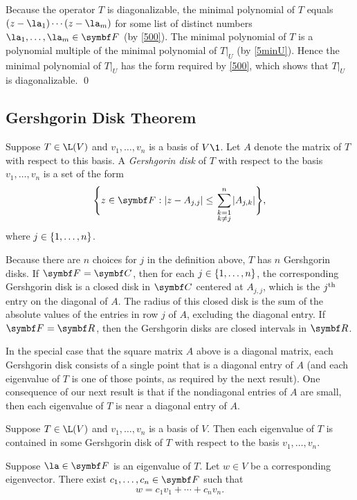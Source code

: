 \proof
Because the operator $T$ is diagonalizable, the minimal polynomial of $T$ equals $(z-\la_1) \cdots (z-\la_m)$ for some list of distinct numbers $\la_1, \ldots, \la_m \in \F{}$ (by \ref{500}). The minimal polynomial of $T$ is a polynomial multiple of the minimal polynomial of $T|_U$ (by \ref{5minU}). Hence the minimal polynomial of $T|_U$ has the form required by \ref{500}, which shows that $T|_U$ is diagonalizable.
\qed

\subsection{Gershgorin Disk Theorem}

{Suppose $T \in \L(V)$ and $v_1, \ldots, v_n$ is a basis of $V\1$. Let $A$ denote the matrix of $T$ with respect to this basis. A \emph{Gershgorin disk} of $T$ with respect to the basis $v_1, \ldots, v_n$ is a set of the
form
\[
\br[\Bigg]{ z \in \F{}: \abs{ z - A_{j,j} } \le \sum_{\scriptstyle k=1 \atop \scriptstyle k\ne j}^n \abs{A_{j,k}}},
\vspace{-.1in} %
\]
where $j \in \{1, \ldots, n\}$.}

Because there are $n$ choices for $j$ in the definition above, $T$ has $n$ Gershgorin disks. If $\F{} = \C{}$, then for each $j \in \{1, \ldots, n\}$, the corresponding Gershgorin disk is a closed disk in $\C{}$ centered at $A_{j,j}$, which is the $j^{\text{{th}}}$ entry on the diagonal of $A$. The radius of this closed disk is the sum of the absolute values of the entries in row $j$ of $A$, excluding the diagonal entry. If $\F{} = \R{}$, then the Gershgorin disks are closed intervals in $\R{}$.

In the special case that the square matrix $A$ above is a diagonal matrix, each Gershgorin disk consists of a single point that is a diagonal entry of $A$ (and each eigenvalue of $T$ is one of those points, as required by the next result). One consequence of our next result is that if the nondiagonal entries of $A$ are small, then each eigenvalue of $T$ is near a diagonal entry of $A$.

{Suppose $T \in \L(V)$ and $v_1, \ldots, v_n$ is a basis of $V$. Then each eigenvalue of $T$ is contained in some Gershgorin disk of $T$ with respect to the basis $v_1, \ldots, v_n$.}

\proof
Suppose $\la \in \F{}$ is an eigenvalue of $T$. Let $w \in V$ be a corresponding eigenvector. There exist $c_1, \ldots, c_n \in \F{}$ such that
\begin{equation} \label{5Ger}
w = c_1 v_1 + \cdots + c_n v_n.
\end{equation}%

